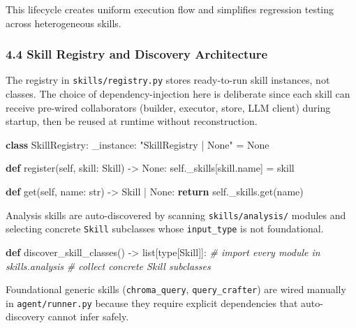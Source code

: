\documentclass[
]{article}
\newenvironment{Shaded}{}{}
\newcommand{\BuiltInTok}[1]{\textcolor[rgb]{0.00,0.50,0.00}{#1}}
\newcommand{\CommentTok}[1]{\textcolor[rgb]{0.38,0.63,0.69}{\textit{#1}}}
\newcommand{\ControlFlowTok}[1]{\textcolor[rgb]{0.00,0.44,0.13}{\textbf{#1}}}
\newcommand{\KeywordTok}[1]{\textcolor[rgb]{0.00,0.44,0.13}{\textbf{#1}}}
\newcommand{\NormalTok}[1]{#1}
\newcommand{\OperatorTok}[1]{\textcolor[rgb]{0.40,0.40,0.40}{#1}}
\newcommand{\StringTok}[1]{\textcolor[rgb]{0.25,0.44,0.63}{#1}}
\newcommand{\VariableTok}[1]{\textcolor[rgb]{0.10,0.09,0.49}{#1}}
\begin{document}
This lifecycle creates uniform execution flow and simplifies regression
testing across heterogeneous skills.

\subsubsection{4.4 Skill Registry and Discovery
Architecture}\label{skill-registry-and-discovery-architecture}

The registry in \texttt{skills/registry.py} stores ready-to-run skill
instances, not classes. The choice of dependency-injection here is
deliberate since each skill can receive pre-wired collaborators
(builder, executor, store, LLM client) during startup, then be reused at
runtime without reconstruction.

\begin{Shaded}
\begin{Highlighting}[]
\KeywordTok{class}\NormalTok{ SkillRegistry:}
\NormalTok{    \_instance: }\StringTok{"SkillRegistry | None"} \OperatorTok{=} \VariableTok{None}

    \KeywordTok{def}\NormalTok{ register(}\VariableTok{self}\NormalTok{, skill: Skill) }\OperatorTok{{-}\textgreater{}} \VariableTok{None}\NormalTok{:}
        \VariableTok{self}\NormalTok{.\_skills[skill.name] }\OperatorTok{=}\NormalTok{ skill}

    \KeywordTok{def}\NormalTok{ get(}\VariableTok{self}\NormalTok{, name: }\BuiltInTok{str}\NormalTok{) }\OperatorTok{{-}\textgreater{}}\NormalTok{ Skill }\OperatorTok{|} \VariableTok{None}\NormalTok{:}
        \ControlFlowTok{return} \VariableTok{self}\NormalTok{.\_skills.get(name)}
\end{Highlighting}
\end{Shaded}

Analysis skills are auto-discovered by scanning
\texttt{skills/analysis/} modules and selecting concrete \texttt{Skill}
subclasses whose \texttt{input\_type} is not foundational.

\begin{Shaded}
\begin{Highlighting}[]
\KeywordTok{def}\NormalTok{ discover\_skill\_classes() }\OperatorTok{{-}\textgreater{}} \BuiltInTok{list}\NormalTok{[}\BuiltInTok{type}\NormalTok{[Skill]]:}
    \CommentTok{\# import every module in skills.analysis}
    \CommentTok{\# collect concrete Skill subclasses}
\end{Highlighting}
\end{Shaded}

Foundational generic skills (\texttt{chroma\_query},
\texttt{query\_crafter}) are wired manually in \texttt{agent/runner.py}
because they require explicit dependencies that auto-discovery cannot
infer safely.
\end{document}
